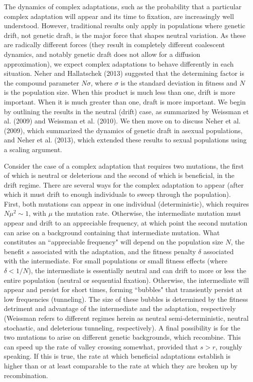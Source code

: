 \documentclass[10pt]{revtex4}
\begin{document}
The dynamics of complex adaptations, such as the probability that a particular complex adaptation will appear and its time to fixation, are increasingly well understood.
However, traditional results only apply in populations where genetic drift, not genetic draft, is the major force that shapes neutral variation.
As these are radically different forces (they result in completely different coalescent dynamics, and notably genetic draft does not allow for a diffusion approximation), we expect complex adaptations to behave differently in each situation.
Neher and Hallatschek (2013) suggested that the determining factor is the compound parameter $N\sigma$, where $\sigma$ is the standard deviation in fitness and $N$ is the population size.
When this product is much less than one, drift is more important.
When it is much greater than one, draft is more important.
We begin by outlining the results in the neutral (drift) case, as summarized by Weissman et al. (2009) and Weissman et al. (2010).
We then move on to discuss Neher et al. (2009), which summarized the dynamics of genetic draft in asexual populations, and Neher et al. (2013), which extended these results to sexual populations using a scaling argument.

Consider the case of a complex adaptation that requires two mutations, the first of which is neutral or deleterious and the second of which is beneficial, in the drift regime.
There are several ways for the complex adaptation to appear (after which it must drift to enough individuals to sweep through the population).
First, both mutations can appear in one individual (deterministic), which requires $N\mu^2 \sim 1$, with $\mu$ the mutation rate.
Otherwise, the intermediate mutation must appear and drift to an appreciable frequency, at which point the second mutation can arise on a background containing that intermediate mutation.
What constitutes an ``appreciable frequency" will depend on the population size $N$, the benefit $s$ associated with the adaptation, and the fitness penalty $\delta$ associated with the intermediate.
For small populations or small fitness effects (where $\delta < 1/N$), the intermediate is essentially neutral and can drift to more or less the entire population (neutral or sequential fixation).
Otherwise, the intermediate will appear and persist for short times, forming ``bubbles" that transiently persist at low frequencies (tunneling).
The size of these bubbles is determined by the fitness detriment and advantage of the intermediate and the adaptation, respectively (Weissman refers to different regimes herein as neutral semi-deterministic, neutral stochastic, and deleterious tunneling, respectively).
A final possibility is for the two mutations to arise on different genetic backgrounds, which recombine.
This can speed up the rate of valley crossing somewhat, provided that $s > r$, roughly speaking.
If this is true, the rate at which beneficial adaptations establish is higher than or at least comparable to the rate at which they are broken up by recombination.
\end{document}
